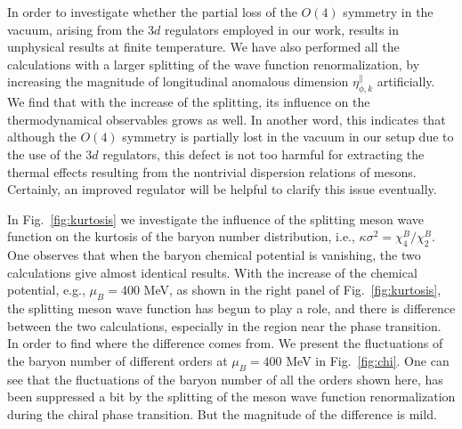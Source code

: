 \documentclass[%
reprint,
superscriptaddress,
showpacs,preprintnumbers,
 amsmath,amssymb,
 aps,
prd,
]{revtex4-1}
\def\Fig#1{Fig.~\ref{#1}} \def\Tab#1{Tab.~\ref{#1}}
\begin{document}
In order to investigate whether the partial loss of the $O(4)$ symmetry in the vacuum, arising from the $3d$ regulators employed in our work, results in unphysical results at finite temperature. We have also performed all the calculations with a larger splitting of the wave function renormalization, by increasing the magnitude of longitudinal anomalous dimension $\eta_{\phi,k}^{\parallel}$ artificially. We find that with the increase of the splitting, its influence on the thermodynamical observables grows as well. In another word, this indicates that although the $O(4)$ symmetry is partially lost in the vacuum in our setup due to the use of the $3d$ regulators, this defect is not too harmful for extracting the thermal effects resulting from the nontrivial dispersion relations of mesons. Certainly, an improved regulator will be helpful to clarify this issue eventually.

In \Fig{fig:kurtosis} we investigate the influence of the splitting meson wave function on the kurtosis of the baryon number distribution, i.e., $\kappa \sigma^2=\chi_4^{B}/\chi_2^{B}$. One observes that when the baryon chemical potential is vanishing, the two calculations give almost identical results. With the increase of the chemical potential, e.g., $\mu_B=400$ MeV, as shown in the right panel of \Fig{fig:kurtosis}, the splitting meson wave function has begun to play a role, and there is difference between the two calculations, especially in the region near the phase transition. In order to find where the difference comes from. We present the fluctuations of the baryon number of different orders at $\mu_B=400$ MeV in \Fig{fig:chi}. One can see that the fluctuations of the baryon number of all the orders shown here, has been suppressed a bit by the splitting of the meson wave function renormalization during the chiral phase transition. But the magnitude of the difference is mild.
\end{document}
